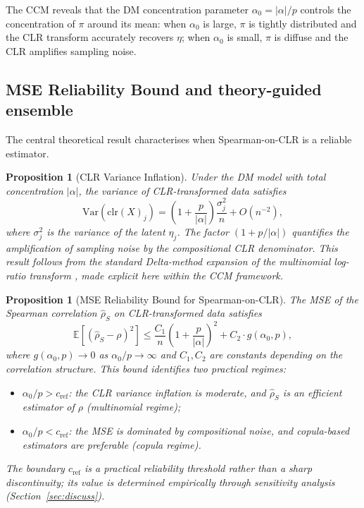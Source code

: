\documentclass[unnumsec,webpdf,contemporary,large,numbered]{oup-authoring-template}
\theoremstyle{plain}
\newtheorem{proposition}[theorem]{Proposition}
\theoremstyle{definition}
\newcommand{\E}{\mathbb{E}}
\newcommand{\Var}{\mathrm{Var}}
\begin{document}
The CCM reveals that the DM concentration parameter $\alpha_0 = |\alpha|/p$ controls the concentration of $\pi$ around its mean: when $\alpha_0$ is large, $\pi$ is tightly distributed and the CLR transform accurately recovers $\eta$; when $\alpha_0$ is small, $\pi$ is diffuse and the CLR amplifies sampling noise.

\subsection{MSE Reliability Bound and theory-guided ensemble}\label{ssec:theory}

The central theoretical result characterises when Spearman-on-CLR is a reliable estimator.

\begin{proposition}[CLR Variance Inflation]\label{thm:variance}
Under the DM model with total concentration $|\alpha|$, the variance of CLR-transformed data satisfies
\begin{equation}
\Var(\text{clr}(X)_j) = \left(1 + \frac{p}{|\alpha|}\right) \frac{\sigma_j^2}{n} + O(n^{-2}),
\end{equation}
where $\sigma_j^2$ is the variance of the latent $\eta_j$. The factor $(1 + p/|\alpha|)$ quantifies the amplification of sampling noise by the compositional CLR denominator. This result follows from the standard Delta-method expansion of the multinomial log-ratio transform \cite{aitchison1986}, made explicit here within the CCM framework.
\end{proposition}

\begin{proposition}[MSE Reliability Bound for Spearman-on-CLR]\label{thm:phase}
The MSE of the Spearman correlation $\hat{\rho}_S$ on CLR-transformed data satisfies
\begin{equation}
\E[(\hat{\rho}_S - \rho)^2] \leq \frac{C_1}{n}\left(1 + \frac{p}{|\alpha|}\right)^{\!2} + C_2 \cdot g(\alpha_0, p),
\end{equation}
where $g(\alpha_0, p) \to 0$ as $\alpha_0/p \to \infty$ and $C_1, C_2$ are constants depending on the correlation structure. This bound identifies two practical regimes:
\begin{itemize}
\item $\alpha_0/p > c_{\text{ref}}$: the CLR variance inflation is moderate, and $\hat{\rho}_S$ is an efficient estimator of $\rho$ (multinomial regime);
\item $\alpha_0/p < c_{\text{ref}}$: the MSE is dominated by compositional noise, and copula-based estimators are preferable (copula regime).
\end{itemize}
The boundary $c_{\text{ref}}$ is a practical reliability threshold rather than a sharp discontinuity; its value is determined empirically through sensitivity analysis (Section~\ref{sec:discuss}).
\end{proposition}
\end{document}
